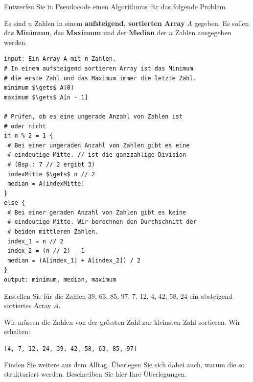 \begin{exercise}
Entwerfen Sie in Pseudocode einen Algorithmus für das folgende Problem.

\begin{problem}\label{problem-min-median-max-n-zahlen}
	Es sind $n$ Zahlen in einem \textbf{aufsteigend, sortierten Array} $A$ gegeben. Es sollen das \textbf{Minimum}, das \textbf{Maximum} und der \textbf{Median} der $n$ Zahlen ausgegeben werden.
\end{problem}
\begin{solution}
\begin{minipage}{\linewidth}
\begin{lstlisting}[language=pseudocode, caption={Algorithmus für das Problem \protect\autoref{problem-min-median-max-n-zahlen}}, label={lst-algo-min-median-max-n-zahlen}]
input: Ein Array A mit n Zahlen.
# In einem aufsteigend sortieren Array ist das Minimum 
# die erste Zahl und das Maximum immer die letzte Zahl.
minimum $\gets$ A[0]
maximum $\gets$ A[n - 1]

# Prüfen, ob es eine ungerade Anzahl von Zahlen ist
# oder nicht
if n % 2 = 1 {
 # Bei einer ungeraden Anzahl von Zahlen gibt es eine 
 # eindeutige Mitte. // ist die ganzzahlige Division
 # (Bsp.: 7 // 2 ergibt 3)
 indexMitte $\gets$ n // 2
 median = A[indexMitte]
}
else {
 # Bei einer geraden Anzahl von Zahlen gibt es keine 
 # eindeutige Mitte. Wir berechnen den Durchschnitt der 
 # beiden mittleren Zahlen.
 index_1 = n // 2
 index_2 = (n // 2) - 1
 median = (A[index_1] + A[index_2]) / 2
}
output: minimum, median, maximum
\end{lstlisting}
\end{minipage}
\end{solution}

\fillwithgrid	{3.5in}
\end{exercise}

\begin{exercise}
Erstellen Sie für die Zahlen 39, 63, 85, 97, 7, 12, 4, 42, 58, 24 ein absteigend sortiertes Array $A$.
\fillwithgrid	{1in}
\end{exercise}
\begin{solution}
\begin{minipage}{\linewidth}
Wir müssen die Zahlen von der grössten Zahl zur kleinsten Zahl sortieren. Wir erhalten:
\begin{center}
\lstinline{[4, 7, 12, 24, 39, 42, 58, 63, 85, 97]}
\end{center}
\end{minipage}
\end{solution}

\begin{exercise}
Finden Sie weitere  aus dem Alltag. Überlegen Sie sich dabei auch, warum die  so strukturiert werden. Beschreiben Sie hier Ihre Überlegungen.
\end{exercise}
